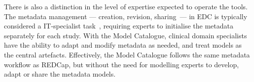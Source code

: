 There is also a distinction in the level of expertise expected to operate
the tools. The metadata management --- creation, revision, sharing~--- in
EDC is typically considered a IT-specialist task~\cite{harr09,fran11}, requiring
experts to initialise the metadata separately for each study. With the Model
Catalogue, clinical domain specialists have the ability to adapt and modify
metadata as needed, and treat models as the central
artefacts. Effectively, the Model Catalogue follows the same metadata
workflow as REDCap, but without the need for modelling experts to
develop, adapt or share the metadata models. 


